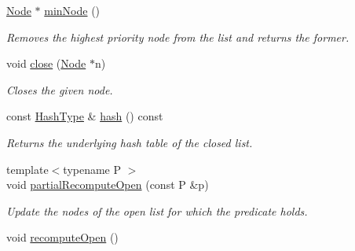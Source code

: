 \begin{DoxyCompactItemize}
\hyperlink{structslb_1_1core_1_1sb_1_1OpenClosedList_ab4cf0f882c69f162e0eccf4abe5ad27e}{Node} $\ast$ \hyperlink{structslb_1_1core_1_1sb_1_1OpenClosedList_a543ef6587ac63c5113fede3932160246}{min\+Node} ()
\begin{DoxyCompactList}\small\item\em Removes the highest priority node from the list and returns the former. \end{DoxyCompactList}\item 
void \hyperlink{structslb_1_1core_1_1sb_1_1OpenClosedList_a08a0a94c44a15c6f9de337b3103bc9b8}{close} (\hyperlink{structslb_1_1core_1_1sb_1_1OpenClosedList_ab4cf0f882c69f162e0eccf4abe5ad27e}{Node} $\ast$n)
\begin{DoxyCompactList}\small\item\em Closes the given node. \end{DoxyCompactList}\item 
const \hyperlink{structslb_1_1core_1_1sb_1_1OpenClosedList_a32a2b03f9f64969e70977f9b5f858b3f}{Hash\+Type} \& \hyperlink{structslb_1_1core_1_1sb_1_1OpenClosedList_a02b31f1b0ce5feea1dc45c00e37d1ebd}{hash} () const 
\begin{DoxyCompactList}\small\item\em Returns the underlying hash table of the closed list. \end{DoxyCompactList}\item 
{\footnotesize template$<$typename P $>$ }\\void \hyperlink{structslb_1_1core_1_1sb_1_1OpenClosedList_ab519aad906ab1335207b3638852a1304}{partial\+Recompute\+Open} (const P \&p)\hypertarget{structslb_1_1core_1_1sb_1_1OpenClosedList_ab519aad906ab1335207b3638852a1304}{}\label{structslb_1_1core_1_1sb_1_1OpenClosedList_ab519aad906ab1335207b3638852a1304}

\begin{DoxyCompactList}\small\item\em Update the nodes of the open list for which the predicate holds. \end{DoxyCompactList}\item 
void \hyperlink{structslb_1_1core_1_1sb_1_1OpenClosedList_a4893b96926c3ef275852f532871d19ec}{recompute\+Open} ()\hypertarget{structslb_1_1core_1_1sb_1_1OpenClosedList_a4893b96926c3ef275852f532871d19ec}{}\label{structslb_1_1core_1_1sb_1_1OpenClosedList_a4893b96926c3ef275852f532871d19ec}


\end{DoxyCompactItemize}
